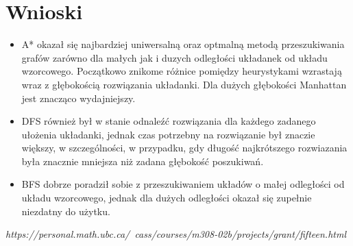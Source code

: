 \documentclass{classrep}
\begin{document}
    \section{Wnioski}
    {
        \begin{itemize}
            \item A* okazał się najbardziej uniwersalną oraz optmalną metodą przeszukiwania grafów zarówno dla małych jak i duzych odległości układanek od układu wzorcowego. Początkowo znikome różnice pomiędzy heurystykami wzrastają wraz z głębokością rozwiązania układanki. Dla dużych głębokości Manhattan jest
            znacząco wydajniejszy.
            \item DFS również był w stanie odnaleźć rozwiązania dla każdego zadanego ułożenia układanki, jednak czas potrzebny na rozwiązanie był znaczie większy,
            w szczególności, w przypadku, gdy długość najkrótszego rozwiazania była znacznie mniejsza niż zadana głębokość poszukiwań.
            \item BFS dobrze poradził sobie z przeszukiwaniem układów o małej odległości od układu wzorcowego, jednak dla dużych odległości okazał się zupełnie niezdatny do użytku.
        \end{itemize}



    }\label{sec:wnioski}

    \begin{thebibliography}{0}
        \textsl{https://personal.math.ubc.ca/~cass/courses/m308-02b/projects/grant/fifteen.html}
    \end{thebibliography}
\end{document}
